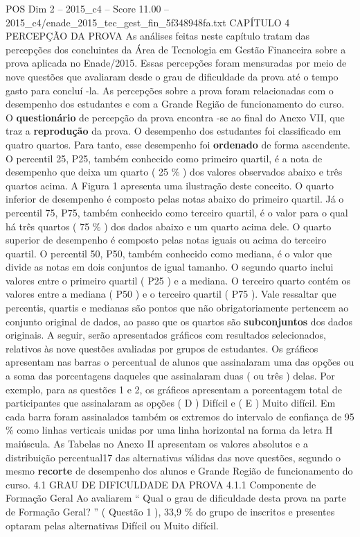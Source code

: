 \begin{textsample}{POS Dim 2 – 2015\_c4 – Score 11.00 – 2015\_c4/enade\_2015\_tec\_gest\_fin\_5f348948fa.txt}  \label{ex:f2_pos_085}
CAPÍTULO 4 PERCEPÇÃO DA PROVA As análises feitas neste capítulo tratam das percepções dos concluintes da Área de Tecnologia em Gestão Financeira sobre a prova aplicada no Enade/2015.
Essas percepções foram mensuradas por meio de nove questões que avaliaram desde o grau de dificuldade da prova até o tempo gasto para concluí -la.
As percepções sobre a prova foram relacionadas com o desempenho dos estudantes e com a Grande Região de funcionamento do curso.
O \textbf{questionário} de percepção da prova encontra -se ao final do Anexo VII, que traz a \textbf{reprodução} da prova.
O desempenho dos estudantes foi classificado em quatro quartos.
Para tanto, esse desempenho foi \textbf{ordenado} de forma ascendente.
O percentil 25, P25, também conhecido como primeiro quartil, é a nota de desempenho que deixa um quarto ( 25 \% ) dos valores observados abaixo e três quartos acima.
A Figura 1 apresenta uma ilustração deste conceito.
O quarto inferior de desempenho é composto pelas notas abaixo do primeiro quartil.
Já o percentil 75, P75, também conhecido como terceiro quartil, é o valor para o qual há três quartos ( 75 \% ) dos dados abaixo e um quarto acima dele.
O quarto superior de desempenho é composto pelas notas iguais ou acima do terceiro quartil.
O percentil 50, P50, também conhecido como mediana, é o valor que divide as notas em dois conjuntos de igual tamanho.
O segundo quarto inclui valores entre o primeiro quartil ( P25 ) e a mediana.
O terceiro quarto contém os valores entre a mediana ( P50 ) e o terceiro quartil ( P75 ).
Vale ressaltar que percentis, quartis e medianas são pontos que não obrigatoriamente pertencem ao conjunto original de dados, ao passo que os quartos são \textbf{subconjuntos} dos dados originais.
A seguir, serão apresentados gráficos com resultados selecionados, relativos às nove questões avaliadas por grupos de estudantes.
Os gráficos apresentam nas barras o percentual de alunos que assinalaram uma das opções ou a soma das porcentagens daqueles que assinalaram duas ( ou três ) delas.
Por exemplo, para as questões 1 e 2, os gráficos apresentam a porcentagem total de participantes que assinalaram as opções ( D ) Difícil e ( E ) Muito difícil.
Em cada barra foram assinalados também os extremos do intervalo de confiança de 95 \% como linhas verticais unidas por uma linha horizontal na forma da letra H maiúscula.
As Tabelas no Anexo II apresentam os valores absolutos e a distribuição percentual17 das alternativas válidas das nove questões, segundo o mesmo \textbf{recorte} de desempenho dos alunos e Grande Região de funcionamento do curso. 4.1 GRAU DE DIFICULDADE DA PROVA 4.1.1 Componente de Formação Geral Ao avaliarem “ Qual o grau de dificuldade desta prova na parte de Formação Geral? ” ( Questão 1 ), 33,9 \% do grupo de inscritos e presentes optaram pelas alternativas Difícil ou Muito difícil.

\end{textsample}
